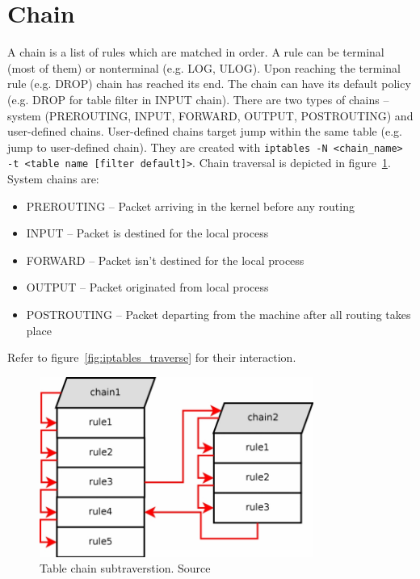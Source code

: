 \documentclass[times, utf8, seminar, english]{fer}
\begin{document}
\section{Chain}
\label{sec:chain}
    A chain is a list of rules which are matched in order. A rule can be terminal (most of them) or nonterminal (e.g. LOG,  ULOG). Upon reaching the terminal rule (e.g. DROP) chain has reached its end. The chain can have its default policy (e.g. DROP for table filter in INPUT chain).
    There are two types of chains -- system (PREROUTING, INPUT, FORWARD, OUTPUT, POSTROUTING) and user-defined chains.
    User-defined chains target jump within the same table (e.g. jump to user-defined chain).
    They are created with \verb|iptables -N <chain_name> -t <table name [filter default]>|.
    Chain traversal is depicted in figure~\ref{fig:iptables_subtraverse}. System chains are:

    \begin{itemize}
        \item PREROUTING -- Packet arriving in the kernel before any routing
        \item INPUT -- Packet is destined for the local process
        \item FORWARD -- Packet isn't destined for the local process
        \item OUTPUT -- Packet originated from local process
        \item POSTROUTING -- Packet departing from the machine after all routing takes place
    \end{itemize}
    Refer to figure~\ref{fig:iptables_traverse} for their interaction.

    \begin{figure}
        \centering
        \includegraphics[width=0.8\textwidth]{table_subtraverse}
        \caption{Table chain subtraverstion. Source~\cite{Iptables99:online}}
        \label{fig:iptables_subtraverse}
    \end{figure}
\end{document}
